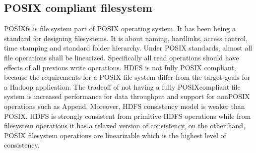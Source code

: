 \subsection{POSIX compliant filesystem}
POSIXfs   is   file  system   part  of  POSIX  operating  system.  It  has   been  being  a  standard  for
designing  filesystems.  It  is   about  naming,  hardlinks,  access   control,  time  stamping  and
standard  folder  hierarchy.  Under  POSIX  standards,  almost  all  file  operations   shall  be
linearized.  Specifically   all  read  operations   should  have  effects   of  all  previous   write
operations.
HDFS  is   not  fully  POSIX compliant, because the requirements  for a POSIX file system  differ
from   the  target  goals   for  a  Hadoop  application.  The  tradeoff  of  not  having  a  fully
POSIXcompliant  file  system   is   increased  performance  for  data  throughput  and  support  for
nonPOSIX  operations   such  as   Append.  Moreover,  HDFS  consistency   model  is   weaker
than  POSIX.  HDFS  is   strongly   consistent  from   primitive  HDFS  operations   while  from
filesystem   operations   it  has   a  relaxed  version  of  consistency,  on  the  other  hand,  POSIX
filesystem operations are linearizable which is the highest level of consistency.



 


